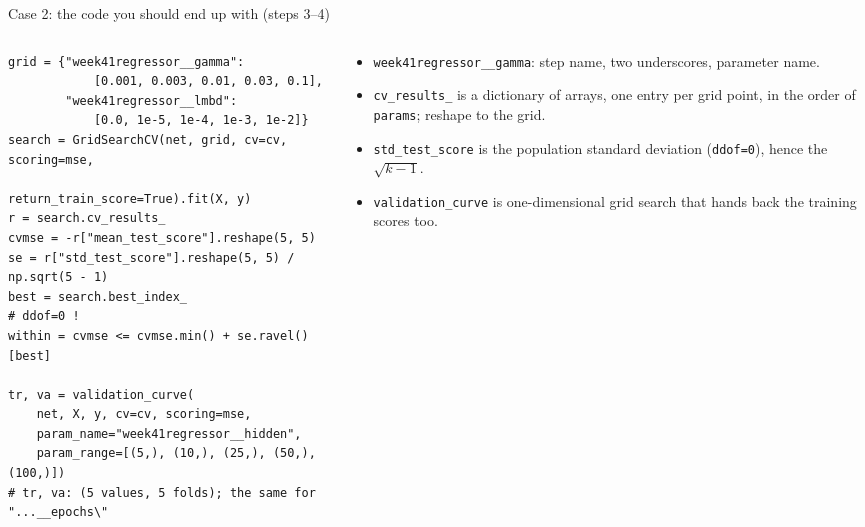 \documentclass[10pt,aspectratio=169]{beamer}
\begin{document}
\begin{frame}[fragile]{Case 2: the code you should end up with (steps 3--4)}
\begin{columns}[T]
\begin{column}{0.66\textwidth}
\begin{lstlisting}
grid = {"week41regressor__gamma":
            [0.001, 0.003, 0.01, 0.03, 0.1],
        "week41regressor__lmbd":
            [0.0, 1e-5, 1e-4, 1e-3, 1e-2]}
search = GridSearchCV(net, grid, cv=cv, scoring=mse,
                      return_train_score=True).fit(X, y)
r = search.cv_results_
cvmse = -r["mean_test_score"].reshape(5, 5)
se = r["std_test_score"].reshape(5, 5) / np.sqrt(5 - 1)
best = search.best_index_                        # ddof=0 !
within = cvmse <= cvmse.min() + se.ravel()[best]

tr, va = validation_curve(
    net, X, y, cv=cv, scoring=mse,
    param_name="week41regressor__hidden",
    param_range=[(5,), (10,), (25,), (50,), (100,)])
# tr, va: (5 values, 5 folds); the same for "...__epochs\"
\end{lstlisting}
\end{column}
\begin{column}{0.32\textwidth}
\small
\begin{itemize}
  \item \texttt{week41regressor\_\_gamma}: step name, two underscores,
        parameter name.
  \item \texttt{cv\_results\_} is a dictionary of arrays, one entry per
        grid point, in the order of \texttt{params}; reshape to the grid.
  \item \texttt{std\_test\_score} is the population standard deviation
        (\texttt{ddof=0}), hence the $\sqrt{k-1}$.
  \item \texttt{validation\_curve} is one-dimensional grid search that
        hands back the training scores too.
\end{itemize}
\end{column}
\end{columns}
\end{frame}
\end{document}
